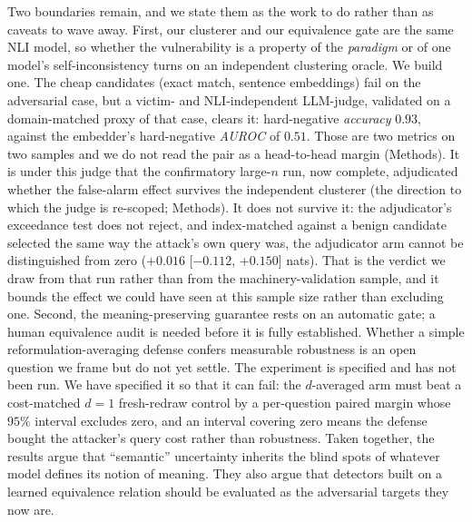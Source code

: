 Two boundaries remain, and we state them as the work to do rather than as caveats to wave away.
First, our clusterer and our equivalence gate are the same NLI model, so whether the
vulnerability is a property of the \emph{paradigm} or of one model's self-inconsistency turns
on an independent clustering oracle. We build one. The cheap candidates (exact match, sentence
embeddings) fail on the adversarial case, but a victim- and NLI-independent LLM-judge,
validated on a domain-matched proxy of that case, clears it: hard-negative \emph{accuracy}
$0.93$, against the embedder's hard-negative \emph{AUROC} of $0.51$. Those are two metrics
on two samples and we do not read the pair as a head-to-head margin (Methods). It is under
this judge that the confirmatory large-$n$ run, now complete, adjudicated whether the
false-alarm effect survives the independent clusterer (the direction to which the judge is
re-scoped; Methods). It does not survive it: the adjudicator's exceedance test does not reject,
and index-matched against a benign candidate selected the same way the attack's own query was,
the adjudicator arm cannot be distinguished from zero ($+0.016$ [$-0.112$, $+0.150$] nats).
That is the verdict we draw from that run rather than from the machinery-validation sample, and
it bounds the effect we could have seen at this sample size rather than excluding one. Second,
the meaning-preserving guarantee rests on an automatic gate; a human equivalence audit is
needed before it is fully established. Whether a simple reformulation-averaging defense confers
measurable robustness is an open question we frame but do not yet settle. The experiment is
specified and has not been run. We have specified it so that it can fail: the $d$-averaged arm
must beat a cost-matched $d{=}1$ fresh-redraw control by a per-question paired margin whose
$95\%$ interval excludes zero, and an interval covering zero means the defense bought the
attacker's query cost rather than robustness. Taken together, the results argue that
``semantic'' uncertainty inherits the blind spots of whatever model defines its notion of
meaning. They also argue that detectors built on a learned equivalence relation should be
evaluated as the adversarial targets they now are.
